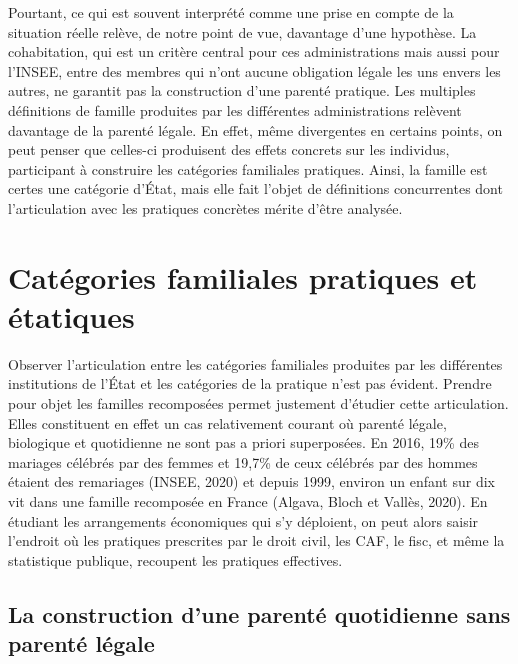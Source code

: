 \documentclass[
  12pt,
]{book}
\begin{document}
Pourtant, ce qui est souvent interprété comme une prise en compte de la
situation réelle relève, de notre point de vue, davantage d'une
hypothèse. La cohabitation, qui est un critère central pour ces
administrations mais aussi pour l'INSEE, entre des membres qui n'ont
aucune obligation légale les uns envers les autres, ne garantit pas la
construction d'une parenté pratique. Les multiples définitions de
famille produites par les différentes administrations relèvent davantage
de la parenté légale. En effet, même divergentes en certains points, on
peut penser que celles-ci produisent des effets concrets sur les
individus, participant à construire les catégories familiales pratiques.
Ainsi, la famille est certes une catégorie d'État, mais elle fait
l'objet de définitions concurrentes dont l'articulation avec les
pratiques concrètes mérite d'être analysée.

\section{Catégories familiales pratiques et
étatiques}\label{catuxe9gories-familiales-pratiques-et-uxe9tatiques}

Observer l'articulation entre les catégories familiales produites par
les différentes institutions de l'État et les catégories de la pratique
n'est pas évident. Prendre pour objet les familles recomposées permet
justement d'étudier cette articulation. Elles constituent en effet un
cas relativement courant où parenté légale, biologique et quotidienne ne
sont pas a priori superposées. En 2016, 19\% des mariages célébrés par
des femmes et 19,7\% de ceux célébrés par des hommes étaient des
remariages (INSEE, 2020) et depuis 1999, environ un enfant sur dix vit
dans une famille recomposée en France (Algava, Bloch et Vallès, 2020).
En étudiant les arrangements économiques qui s'y déploient, on peut
alors saisir l'endroit où les pratiques prescrites par le droit civil,
les CAF, le fisc, et même la statistique publique, recoupent les
pratiques effectives.

\subsection{La construction d'une parenté quotidienne sans parenté
légale}\label{la-construction-dune-parentuxe9-quotidienne-sans-parentuxe9-luxe9gale}
\end{document}
